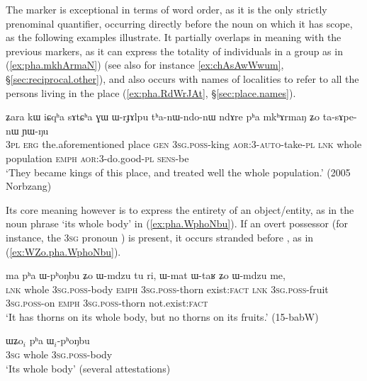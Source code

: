 The marker  is exceptional in terms of word order, as it is the only strictly prenominal quantifier, occurring directly before the noun on which it has scope, as the following examples illustrate. It partially overlaps in meaning with the previous markers, as it can express the totality of individuals in a group as in (\ref{ex:pha.mkhArmaN}) (see also for instance \ref{ex:chAsAwWwum}, §\ref{sec:reciprocal.other}), and also occurs with names of localities to refer to all the persons living in the place (\ref{ex:pha.RdWrJAt}, §\ref{sec:place.names}).

 \begin{exe}
\ex \label{ex:pha.mkhArmaN}
\gll ʑara kɯ iɕqʰa sɤtɕʰa ɣɯ ɯ-rɟɤlpu tʰa-nɯ-ndo-nɯ ndɤre pʰa mkʰɤrmaŋ ʑo ta-sɤpe-nɯ ɲɯ-ŋu \\
\textsc{3pl} \textsc{erg} the.aforementioned place  \textsc{gen} \textsc{3sg}.\textsc{poss}-king \textsc{aor}:3\flobv{}-\textsc{auto}-take-\textsc{pl} \textsc{lnk} whole population \textsc{emph} \textsc{aor}:3\flobv{}-do.good-\textsc{pl} \textsc{sens}-be \\
\glt `They became kings of this place, and treated well the whole population.' (2005 Norbzang)
  \end{exe}
  
Its core meaning however is to express the entirety of an object/entity, as in the noun phrase   `its whole body' in (\ref{ex:pha.WphoNbu}). If an overt possessor (for instance, the \textsc{3sg} pronoun ) is present, it occurs stranded before , as in (\ref{ex:WZo.pha.WphoNbu}).

 \begin{exe}
\ex \label{ex:pha.WphoNbu}
\gll ma pʰa ɯ-pʰoŋbu ʑo ɯ-mdzu tu ri, ɯ-mat ɯ-taʁ ʑo ɯ-mdzu me,  \\
\textsc{lnk} whole \textsc{3sg}.\textsc{poss}-body \textsc{emph} \textsc{3sg}.\textsc{poss}-thorn exist:\textsc{fact} \textsc{lnk} \textsc{3sg}.\textsc{poss}-fruit  \textsc{3sg}.\textsc{poss}-on \textsc{emph}   \textsc{3sg}.\textsc{poss}-thorn not.exist:\textsc{fact} \\
\glt `It has thorns on its whole body, but no thorns on its fruits.' (15-babW)
  \end{exe}
  
 \begin{exe}
\ex \label{ex:WZo.pha.WphoNbu}
\gll  ɯʑo$_i$  pʰa ɯ$_i$-pʰoŋbu  \\
\textsc{3sg} whole \textsc{3sg}.\textsc{poss}-body \\
\glt `Its whole body' (several attestations)
\end{exe}
  
